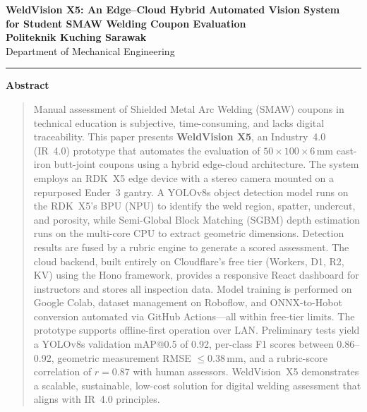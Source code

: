 \documentclass[12pt,a4paper]{article}
\begin{document}

\begin{center}
  {\Large\bfseries\color{darkblue}
    WeldVision X5: An Edge--Cloud Hybrid Automated Vision System\\[4pt]
    for Student SMAW Welding Coupon Evaluation
  }\\[12pt]
  {\normalsize\textbf{Politeknik Kuching Sarawak}\\
   Department of Mechanical Engineering}
\end{center}

\vspace{6pt}
\noindent\rule{\linewidth}{1pt}
\vspace{4pt}

\begin{center}{\bfseries Abstract}\end{center}
\begin{quotation}\noindent
Manual assessment of Shielded Metal Arc Welding (SMAW) coupons in technical education is subjective,
time-consuming, and lacks digital traceability. This paper presents \textbf{WeldVision X5}, an Industry~4.0
(IR~4.0) prototype that automates the evaluation of $50\times100\times6$\,mm cast-iron butt-joint coupons
using a hybrid edge-cloud architecture. The system employs an RDK~X5 edge device with a stereo camera
mounted on a repurposed Ender~3 gantry. A YOLOv8s object detection model runs on the RDK~X5's BPU (NPU)
to identify the weld region, spatter, undercut, and porosity, while Semi-Global Block Matching (SGBM) depth
estimation runs on the multi-core CPU to extract geometric dimensions. Detection results are fused by a rubric
engine to generate a scored assessment. The cloud backend, built entirely on Cloudflare's free tier (Workers,
D1, R2, KV) using the Hono framework, provides a responsive React dashboard for instructors and stores all
inspection data. Model training is performed on Google Colab, dataset management on Roboflow, and
ONNX-to-Hobot conversion automated via GitHub Actions---all within free-tier limits. The prototype supports
offline-first operation over LAN. Preliminary tests yield a YOLOv8s validation mAP@0.5 of 0.92, per-class
F1 scores between 0.86--0.92, geometric measurement RMSE $\le 0.38$\,mm, and a rubric-score correlation of
$r=0.87$ with human assessors. WeldVision~X5 demonstrates a scalable, sustainable, low-cost solution for
digital welding assessment that aligns with IR~4.0 principles.
\end{quotation}
\end{document}
